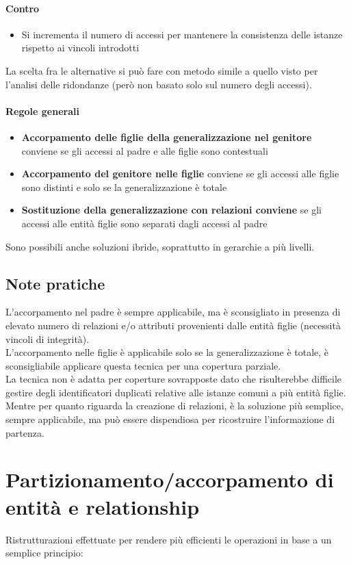 \paragraph*{Contro}
\begin{itemize}
    \item Si incrementa il numero di accessi per mantenere la consistenza delle istanze rispetto
    ai vincoli introdotti
\end{itemize}
La scelta fra le alternative si può fare con metodo simile a quello visto per l'analisi
delle ridondanze (però non basato solo sul numero degli accessi).
\paragraph*{Regole generali}
\begin{itemize}
    \item \textbf{Accorpamento delle figlie della generalizzazione nel genitore} conviene se gli accessi
    al padre e alle figlie sono contestuali
    \item \textbf{Accorpamento del genitore nelle figlie} conviene se gli accessi alle figlie sono distinti e
    solo se la generalizzazione è totale
    \item \textbf{Sostituzione della generalizzazione con relazioni conviene} se gli accessi alle entità figlie
    sono separati dagli accessi al padre
\end{itemize}
Sono possibili anche soluzioni ibride, soprattutto in gerarchie a più livelli.
\subsection{Note pratiche}
L'accorpamento nel padre è sempre applicabile, ma è sconsigliato in presenza di
elevato numero di relazioni e/o attributi provenienti dalle entità figlie (necessità
vincoli di integrità).\\
L'accorpamento nelle figlie è applicabile solo se la generalizzazione è totale, è
sconsigliabile applicare questa tecnica per una copertura parziale.\\
La tecnica non è adatta per coperture sovrapposte dato che risulterebbe difficile
gestire degli identificatori duplicati relative alle istanze comuni a più entità figlie.\\
Mentre per quanto riguarda la creazione di relazioni, è la soluzione più semplice, sempre applicabile, 
ma può essere dispendiosa per ricostruire l'informazione di partenza.
\section{Partizionamento/accorpamento di entità e relationship}
Ristrutturazioni effettuate per rendere più efficienti le operazioni in base a un
semplice principio:
